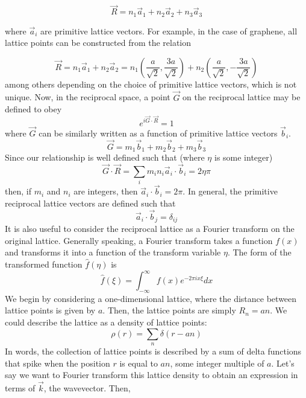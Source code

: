 \documentclass{article}
\begin{document}
\begin{equation}
\vec{R} = n_{1}\vec{a}_{1} + n_{2}\vec{a}_{2} + n_{3}\vec{a}_{3}
\end{equation}

where $\vec{a}_{i}$ are primitive lattice vectors. For example, in the case of
graphene, all lattice points can be constructed from the relation

\begin{equation}
\vec{R} = n_{1}\vec{a}_{1} + n_{2}\vec{a}_2 = n_{1}(\frac{a}{\sqrt{2}}, \frac{3a}{\sqrt{2}}) + n_{2}(\frac{a}{\sqrt{2}}, -\frac{3a}{\sqrt{2}})
\end{equation}
among others depending on the choice of primitive lattice vectors, which is not unique.
Now, in the reciprocal space, a point $\vec{G}$ on the reciprocal lattice may be defined to obey
\begin{equation}
e^{i\vec{G}\cdot\vec{R}} = 1
\end{equation}
where $\vec{G}$ can be similarly written as a function of primitive lattice vectors $\vec{b}_{i}$.
\begin{equation}
\vec{G} = m_{1}\vec{b}_{1} + m_{2}\vec{b}_{2} + m_{3}\vec{b}_{3}
\end{equation}
Since our relationship is well defined such that (where $\eta$ is some integer)
\begin{equation}
\vec{G}\cdot\vec{R} = \sum_{i}m_{i}n_{i}\vec{a}_{i}\cdot\vec{b}_{i} = 2\eta\pi
\end{equation}
then, if $m_{i}$ and $n_{i}$ are integers, then $\vec{a}_{i}\cdot\vec{b}_{i} = 2\pi$. In general, the primitive
reciprocal lattice vectors are defined such that
\begin{equation}
\vec{a}_{i}\cdot\vec{b}_{j} = \delta_{ij}
\end{equation}
It is also useful to consider the reciprocal lattice as a Fourier transform on the original lattice.
Generally speaking, a Fourier transform takes a function $f(x)$ and transforms it into a function of
the transform variable $\eta$. The form of the transformed function $\hat{f}(\eta)$ is
\begin{equation}
\hat{f}(\xi) = \int_{-\infty}^{\infty} f(x)e^{-2\pi ix\xi}dx
\end{equation}
We begin by considering a one-dimensional lattice, where the distance between lattice points is
given by $a$. Then, the lattice points are simply $R_{n} = an$. We could describe the lattice as a
density of lattice points:
\begin{equation}
\rho(r) = \sum_{n}\delta(r - an)
\end{equation}
In words, the collection of lattice points is described by a sum of delta functions that spike when the
position $r$ is equal to $an$, some integer multiple of $a$. Let's say we want to Fourier transform this
lattice density to obtain an expression in terms of $\vec{k}$, the wavevector. Then,
\end{document}
